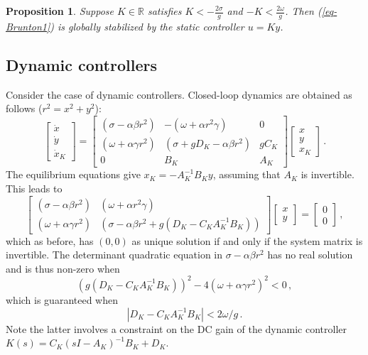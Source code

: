\documentclass[12pt, a4paper,reqno]{amsart}
\newcommand{\x}{\mathbf x}
\newcommand{\y}{\mathbf y}
\newtheorem{proposition}{\bf Proposition}
\theoremstyle{definition}
\begin{document}
\begin{proposition}
    Suppose $K \in \mathbb R$ satisfies $K < -\frac{2\sigma}{g}$ and $-K < \frac{2\omega}{g}$. 
    Then {\rm (\ref{eq-Brunton1})}
    is globally stabilized by the static controller $u=Ky$.
\end{proposition}




\subsection{Dynamic controllers}
Consider the case of  dynamic controllers. Closed-loop dynamics are obtained as follows ($r^2=x^2+y^2$):
$$
\begin{bmatrix} \dot x \\ \dot y \\ \dot x_K \end{bmatrix} = 
\begin{bmatrix}
(\sigma-\alpha \beta r^2) &  -(\omega + \alpha r^2 \gamma)   & 0  \\
(\omega + \alpha \gamma r^2) & (\sigma + g D_K-\alpha \beta r^2) & g C_K \\
0 & B_K  & A_K 
\end{bmatrix}
\begin{bmatrix} x \\ y \\x_K \end{bmatrix}\,.
$$
%
The equilibrium equations give $x_K = -A_K^{-1} B_K y$, assuming that $A_K$ is invertible. This leads to 
$$
\begin{bmatrix} (\sigma-\alpha \beta r^2) &  (\omega + \alpha r^2 \gamma) \\
(\omega + \alpha \gamma r^2) & (\sigma -\alpha \beta r^2 + g (D_K -C_K A_K^{-1} B_K))
\end{bmatrix} \begin{bmatrix} x\\y\end{bmatrix}=\begin{bmatrix}0\\0\end{bmatrix}\,,
$$
%
which as before,  has $(0,0)$ as unique solution if and only if the system matrix is invertible. The determinant quadratic equation in $\sigma-\alpha \beta r^2$ has no real solution and is thus non-zero when  
$$ ( g (D_K -C_K A_K^{-1} B_K))^2-4(\omega + \alpha \gamma r^2)^2 < 0\,,$$
which is guaranteed when
$$|D_K -C_K A_K^{-1} B_K| < 2\omega/g  \,.$$
Note the latter involves a  constraint  on the DC gain of the dynamic controller $K(s)= C_K(sI-A_K)^{-1}B_K + D_K$. 
\end{document}
